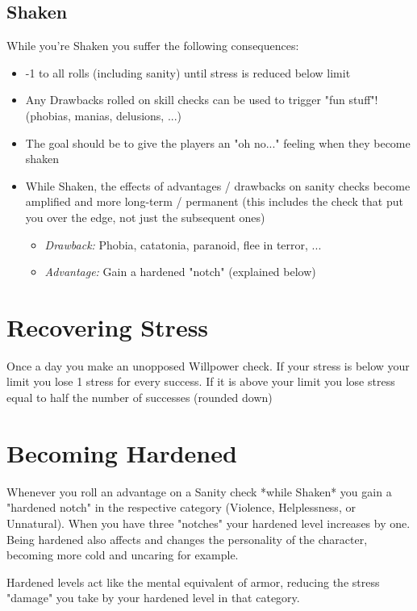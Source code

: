 \subsection{Shaken}
While you're Shaken you suffer the following consequences:
\begin{itemize}
    \item -1 to all rolls (including sanity) until stress is reduced below limit
    \item Any Drawbacks rolled on skill checks can be used to trigger "fun stuff"! (phobias, manias, delusions, ...)
    \item The goal should be to give the players an "oh no..." feeling when they become shaken
    \item While Shaken, the effects of advantages / drawbacks on sanity checks become amplified and more long-term / permanent (this includes the check that put you over the edge, not just the subsequent ones)
    \begin{itemize}
        \item \textit{Drawback:} Phobia, catatonia, paranoid, flee in terror, ...
        \item \textit{Advantage:} Gain a hardened "notch" (explained below)
    \end{itemize}
\end{itemize}

\section{Recovering Stress}
Once a day you make an unopposed Willpower check. If your stress is below your limit you lose 1 stress for every success. If it is above your limit you lose stress equal to half the number of successes (rounded down) 


\section{Becoming Hardened}

Whenever you roll an advantage on a Sanity check *while Shaken* you gain a "hardened notch" in the respective category (Violence, Helplessness, or Unnatural). When you have three "notches" your hardened level increases by one. 
Being hardened also affects and changes the personality of the character, becoming more cold and uncaring for example.

Hardened levels act like the mental equivalent of armor, reducing the stress "damage" you take by your hardened level in that category.



